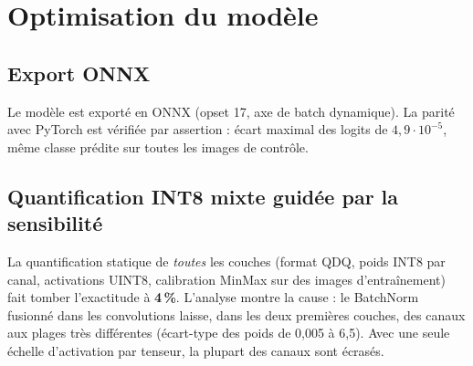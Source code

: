\documentclass[11pt,a4paper]{article}
\begin{document}
\section{Optimisation du modèle}
\subsection{Export ONNX}
Le modèle est exporté en ONNX (opset 17, axe de batch dynamique). La parité avec PyTorch est vérifiée par assertion : écart maximal des logits de $4,9\cdot10^{-5}$, même classe prédite sur toutes les images de contrôle.

\subsection{Quantification INT8 mixte guidée par la sensibilité}
La quantification statique de \emph{toutes} les couches (format QDQ, poids INT8 par canal, activations UINT8, calibration MinMax sur des images d'entraînement) fait tomber l'exactitude à \textbf{4\,\%}. L'analyse montre la cause : le BatchNorm fusionné dans les convolutions laisse, dans les deux premières couches, des canaux aux plages très différentes (écart-type des poids de 0,005 à 6,5). Avec une seule échelle d'activation par tenseur, la plupart des canaux sont écrasés.
\end{document}
